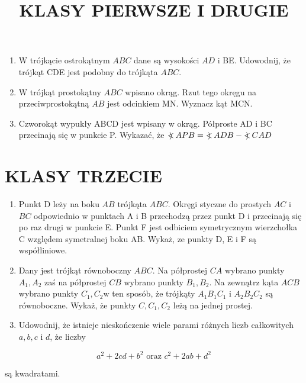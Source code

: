 \documentclass[10pt]{article}
\title{KLASY PIERWSZE I DRUGIE }
\author{}
\date{}
\newcommand\Varangle{\mathop{{<\!\!\!\!\!\text{\small)}}\:}\nolimits}
\begin{document}
\maketitle
\begin{enumerate}
  \item W trójkącie ostrokątnym \(A B C\) dane są wysokości \(A D\) i BE. Udowodnij, że trójkąt CDE jest podobny do trójkąta \(A B C\).
  \item W trójkąt prostokątny \(A B C\) wpisano okrąg. Rzut tego okręgu na przeciwprostokątną \(A B\) jest odcinkiem MN. Wyznacz kąt MCN.
  \item Czworokąt wypukły ABCD jest wpisany w okrąg. Półproste AD i BC przecinają się w punkcie P. Wykazać, że \(\Varangle A P B=\Varangle A D B-\Varangle C A D\)
\end{enumerate}

\section*{KLASY TRZECIE}
\begin{enumerate}
  \item Punkt D leży na boku \(A B\) trójkąta \(A B C\). Okręgi styczne do prostych \(A C\) i \(B C\) odpowiednio w punktach A i B przechodzą przez punkt D i przecinają się po raz drugi w punkcie E. Punkt F jest odbiciem symetrycznym wierzchołka C względem symetralnej boku AB. Wykaż, ze punkty D, E i F są współliniowe.
  \item Dany jest trójkąt równoboczny \(A B C\). Na półprostej \(C A\) wybrano punkty \(A_{1}, A_{2}\) zaś na półprostej \(C B\) wybrano punkty \(B_{1}, B_{2}\). Na zewnątrz kąta \(A C B\) wybrano punkty \(C_{1}, C_{2} \mathrm{w}\) ten sposób, że trójkąty \(A_{1} B_{1} C_{1}\) i \(A_{2} B_{2} C_{2}\) są równoboczne. Wykaż, że punkty \(C, C_{1}, C_{2}\) leżą na jednej prostej.
  \item Udowodnij, że istnieje nieskończenie wiele parami różnych liczb całkowitych \(a, b, c\) i \(d\), że liczby
\end{enumerate}

\[
a^{2}+2 c d+b^{2} \text { oraz } c^{2}+2 a b+d^{2}
\]

są kwadratami.
\end{document}
